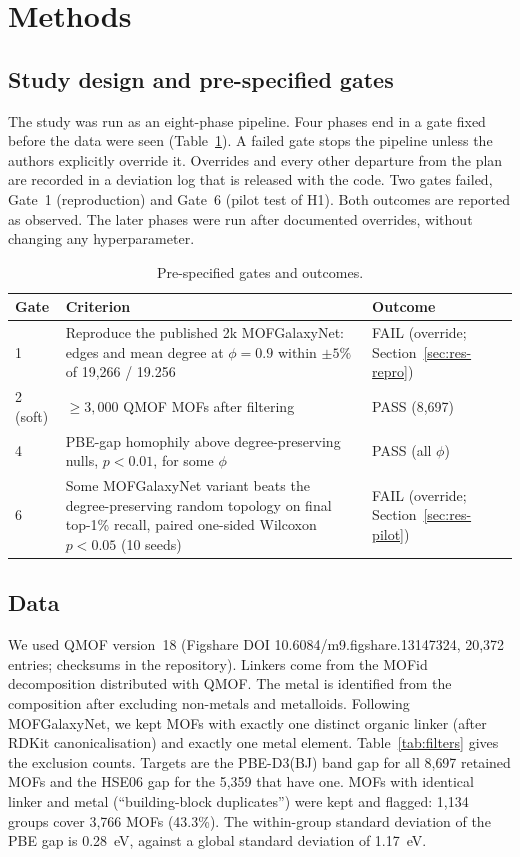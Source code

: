 \section{Methods}
\label{sec:methods}

\subsection{Study design and pre-specified gates}
\label{sec:gates}
The study was run as an eight-phase pipeline. Four phases end in a gate fixed before the data were seen (Table~\ref{tab:gates}). A failed gate stops the pipeline unless the authors explicitly override it. Overrides and every other departure from the plan are recorded in a deviation log that is released with the code. Two gates failed, Gate~1 (reproduction) and Gate~6 (pilot test of H1). Both outcomes are reported as observed. The later phases were run after documented overrides, without changing any hyperparameter.

\begin{table}[t]
\centering
\caption{Pre-specified gates and outcomes.}
\label{tab:gates}
\small
\begin{tabular}{@{}lp{6.2cm}p{4.6cm}@{}}
\toprule
Gate & Criterion & Outcome \\
\midrule
1 & Reproduce the published 2k MOFGalaxyNet: edges and mean degree at $\phi=0.9$ within $\pm5\%$ of 19{,}266 / 19.256 & FAIL (override; Section~\ref{sec:res-repro}) \\
2 (soft) & $\geq 3{,}000$ QMOF MOFs after filtering & PASS (8{,}697) \\
4 & PBE-gap homophily above degree-preserving nulls, $p<0.01$, for some $\phi$ & PASS (all $\phi$) \\
6 & Some MOFGalaxyNet variant beats the degree-preserving random topology on final top-1\% recall, paired one-sided Wilcoxon $p<0.05$ (10 seeds) & FAIL (override; Section~\ref{sec:res-pilot}) \\
\bottomrule
\end{tabular}
\end{table}

\subsection{Data}
\label{sec:data}
We used QMOF version~18 \citep{rosen2021qmof,rosen2022qmof} (Figshare DOI 10.6084/m9.figshare.13147324, 20{,}372 entries; checksums in the repository). Linkers come from the MOFid decomposition \citep{bucior2019mofid} distributed with QMOF. The metal is identified from the composition after excluding non-metals and metalloids. Following MOFGalaxyNet, we kept MOFs with exactly one distinct organic linker (after RDKit canonicalisation) and exactly one metal element. Table~\ref{tab:filters} gives the exclusion counts. Targets are the PBE-D3(BJ) band gap \citep{perdew1996pbe} for all 8{,}697 retained MOFs and the HSE06 gap \citep{heyd2003hse} for the 5{,}359 that have one. MOFs with identical linker and metal (``building-block duplicates'') were kept and flagged: 1{,}134 groups cover 3{,}766 MOFs (43.3\%). The within-group standard deviation of the PBE gap is 0.28~eV, against a global standard deviation of 1.17~eV.

